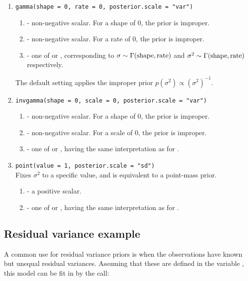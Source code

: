 \documentclass[article,shortnames]{jss}
\begin{document}
\begin{enumerate}
\item
\verb?gamma(shape = 0, rate = 0, posterior.scale = "var")?  \begin{enumerate}
  \item {} - non-negative scalar. For a shape of 0, the
    prior is improper.
  \item {} - non-negative scalar. For a rate of 0, the prior
    is improper.
  \item {} - one of  or
    , corresponding to $\sigma \sim \Gamma({\rm shape},
    {\rm rate})$ and $\sigma^2 \sim \Gamma({\rm shape}, {\rm rate})$ respectively.
  \end{enumerate}
  The default setting applies the improper prior $p(\sigma^2)\propto
  (\sigma^2)^{-1}$.
\item
\verb?invgamma(shape = 0, scale = 0, posterior.scale = "var")?  \begin{enumerate}
  \item {} - non-negative scalar. For a shape of 0, the
    prior is improper.
  \item {} - non-negative scalar. For a scale of 0, the prior
    is improper.
  \item {} - one of  or
    , having the same interpretation as for .
  \end{enumerate}
\item
\verb?point(value = 1, posterior.scale = "sd")?\\
Fixes $\sigma^2$ to a specific value, and is equivalent to a
  point-mass prior.
  \begin{enumerate}
  \item {} - a positive scalar.
  \item {} - one of  or
    , having the same interpretation as for .
  \end{enumerate}
\end{enumerate}

\subsection{Residual variance example}

A common use for residual variance priors is when the observations
have known but unequal residual variances. Assuming that these are
defined in the variable , this model can be fit in
 by the call:
\end{document}
